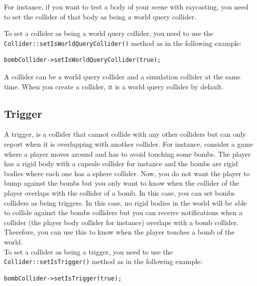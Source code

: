 \documentclass[a4paper,12pt]{article}
\begin{document}
    For instance, if you want to test a body of your scene with raycasting, you need to set the collider of that body as being a world query collider.

    To set a collider as being a world query collider, you need to use the \texttt{Collider::\allowbreak setIsWorldQueryCollider()} method as in the following example: \\

    \begin{lstlisting}
bombCollider->setIsWorldQueryCollider(true);
   \end{lstlisting}

    \vspace{0.6cm}

    A collider can be a world query collider and a simulation collider at the same time. When you create a collider, it is a world query collider by default.

    \subsection{Trigger}
    \label{sec:trigger}

    A trigger, is a collider that cannot collide with any other colliders but can only report when it is overlapping with another collider. For instance,
    consider a game where a player moves around and has to avoid touching some bombs. The player has a rigid body with a capsule collider for instance and
    the bombs are rigid bodies where each one has a sphere collider. Now, you do not want the player to bump against the bombs but you only want to know
    when the collider of the player overlaps with the collider of a bomb. In this case, you can set bombs colliders as being triggers. In this
    case, no rigid bodies in the world will be able to collide against the bombs colliders but you can receive notifications when a collider (the player
    body collider for instance) overlaps with a bomb collider. Therefore, you can use this to know when the player touches a bomb of the world. \\
    
    To set a collider as being a trigger, you need to use the \texttt{Collider::setIsTrigger()} method as in the following example: \\

    \begin{lstlisting}
bombCollider->setIsTrigger(true);
   \end{lstlisting}
\end{document}
